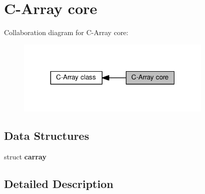 \section{C-\/\+Array core}
\label{group__core__group}
Collaboration diagram for C-\/\+Array core\+:\nopagebreak
\begin{figure}[H]
\begin{center}
\leavevmode
\includegraphics[width=265pt]{group__core__group}
\end{center}
\end{figure}
\subsection*{Data Structures}
\begin{DoxyCompactItemize}
\item 
struct {\bf carray}
\end{DoxyCompactItemize}


\subsection{Detailed Description}
